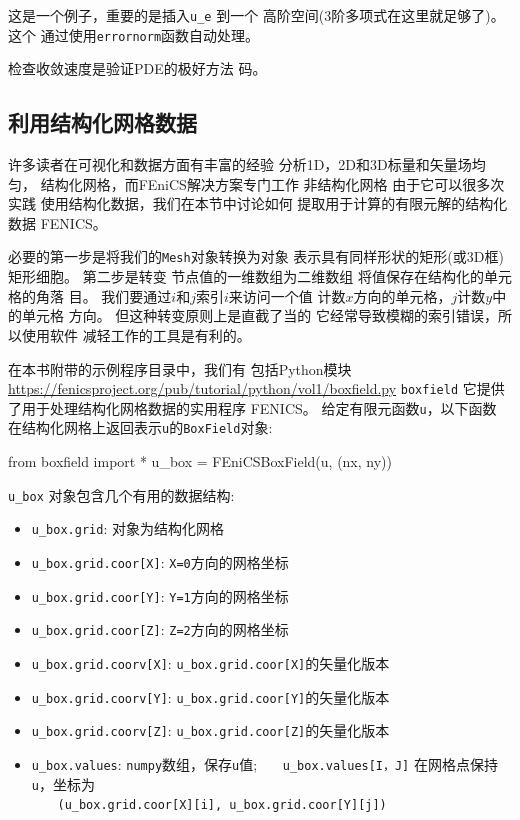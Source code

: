 \noindent
这是一个例子，重要的是插入\verb!u_e! 到一个
高阶空间(3阶多项式在这里就足够了)。 这个
通过使用\texttt{errornorm}函数自动处理。

检查收敛速度是验证PDE的极好方法
码。

\subsection{利用结构化网格数据}
\label{ftut:structviz}

许多读者在可视化和数据方面有丰富的经验
分析1D，2D和3D标量和矢量场均匀，
结构化网格，而FEniCS解决方案专门工作
非结构化网格 由于它可以很多次实践
使用结构化数据，我们在本节中讨论如何
提取用于计算的有限元解的结构化数据
FENICS。


必要的第一步是将我们的\texttt{Mesh}对象转换为对象
表示具有同样形状的矩形(或3D框)
矩形细胞。 第二步是转变
节点值的一维数组为二维数组
将值保存在结构化的单元格的角落
目。 我们要通过$i$和$j$索引$i$来访问一个值
计数$x$方向的单元格，$j$计数$y$中的单元格
方向。 但这种转变原则上是直截了当的
它经常导致模糊的索引错误，所以使用软件
减轻工作的工具是有利的。

在本书附带的示例程序目录中，我们有
包括Python模块
\url{https://fenicsproject.org/pub/tutorial/python/vol1/boxfield.py} 
{\nolinkurl{boxfield}}
它提供了用于处理结构化网格数据的实用程序
FENICS。 给定有限元函数\texttt{u}，以下函数
在结构化网格上返回表示\texttt{u}的\texttt{BoxField}对象:

\begin{python}
from boxfield import *
u_box = FEniCSBoxField(u, (nx, ny))
\end{python}

\verb!u_box! 对象包含几个有用的数据结构:

\begin{itemize}
 \item \verb!u_box.grid!: 对象为结构化网格

 \item \verb!u_box.grid.coor[X]!: \texttt{X=0}方向的网格坐标

 \item \verb!u_box.grid.coor[Y]!: \texttt{Y=1}方向的网格坐标

 \item \verb!u_box.grid.coor[Z]!: \texttt{Z=2}方向的网格坐标

 \item \verb!u_box.grid.coorv[X]!: \verb!u_box.grid.coor[X]!的矢量化版本

 \item \verb!u_box.grid.coorv[Y]!: \verb!u_box.grid.coor[Y]!的矢量化版本

 \item \verb!u_box.grid.coorv[Z]!: \verb!u_box.grid.coor[Z]!的矢量化版本

 \item \verb!u_box.values!: \texttt{numpy}数组，保存\texttt{u}值;
   \verb!u_box.values[I，J]! 在网格点保持\texttt{u}，坐标为\\
    \verb!(u_box.grid.coor[X][i], u_box.grid.coor[Y][j])!
\end{itemize}

